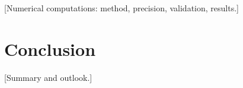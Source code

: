 \documentclass[11pt, a4paper]{article}
\theoremstyle{plain}
\theoremstyle{definition}
\begin{document}
[Numerical computations: method, precision, validation, results.]

\section{Conclusion}
\label{sec:conclusion}

[Summary and outlook.]



\end{document}
